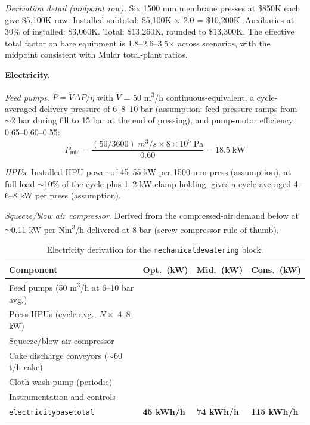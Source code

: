 \documentclass{article}
\renewcommand\_{\textunderscore\allowbreak}
\begin{document}
\noindent \textit{Derivation detail (midpoint row).} Six 1500 mm membrane presses at \$850K each give \$5,100K raw. Installed subtotal: \$5,100K $\times$ 2.0 = \$10,200K. Auxiliaries at 30\% of installed: \$3,060K. Total: \$13,260K, rounded to \$13,300K. The effective total factor on bare equipment is 1.8--2.6--3.5$\times$ across scenarios, with the midpoint consistent with Mular total-plant ratios.

\medskip
\noindent\textbf{Electricity.}\quad

\textit{Feed pumps.} $P = \dot{V} \Delta P / \eta$ with $\dot{V}$ = 50 \si{m^3/h} continuous-equivalent, a cycle-averaged delivery pressure of 6--8--10 bar (assumption: feed pressure ramps from $\sim$2 bar during fill to 15 bar at the end of pressing), and pump-motor efficiency 0.65--0.60--0.55:
\[
	P_\text{mid} = \frac{(50/3600)\;\si{m^3/s} \times 8\times10^5\;\text{Pa}}{0.60} = 18.5\;\text{kW}
\]
 
\textit{HPUs.} Installed HPU power of 45--55 kW per 1500 mm press (assumption), at full load $\sim$10\% of the cycle plus 1--2 kW clamp-holding, gives a cycle-averaged 4--6--8 kW per press (assumption).
 
\textit{Squeeze/blow air compressor.} Derived from the compressed-air demand below at $\sim$0.11 kW per \si{Nm^3/h} delivered at 8 bar (screw-compressor rule-of-thumb).
 
\begin{table}[h!]
\caption{Electricity derivation for the \texttt{mechanical\_dewatering} block.}
\centering
\begin{tabular}{>{\raggedright\arraybackslash}p{6.2cm}
				>{\raggedright\arraybackslash}p{2.0cm}
				>{\raggedright\arraybackslash}p{2.0cm}
				>{\raggedright\arraybackslash}p{2.0cm}}
\toprule
\textbf{Component} & \textbf{Opt.\ (kW)} & \textbf{Mid.\ (kW)} & \textbf{Cons.\ (kW)} \\
\midrule
Feed pumps (50 \si{m^3/h} at 6--10 bar avg.) & 13 & 19 & 25 \\
Press HPUs (cycle-avg., $N \times$ 4--8 kW) & 20 & 36 & 64 \\
Squeeze/blow air compressor & 4 & 7 & 10 \\
Cake discharge conveyors ($\sim$60 t/h cake) & 4 & 6 & 8 \\
Cloth wash pump (periodic) & 2 & 3 & 5 \\
Instrumentation and controls & 2 & 3 & 3 \\
\midrule
\texttt{electricity\_base\_total} & \textbf{45 kWh/h} & \textbf{74 kWh/h} & \textbf{115 kWh/h} \\
\bottomrule
\end{tabular}
\end{table}
\end{document}
